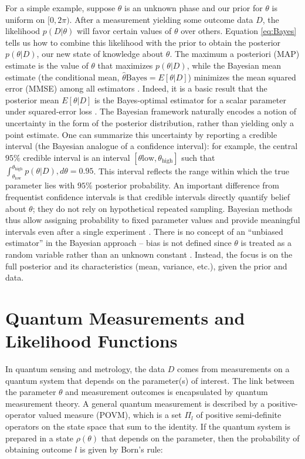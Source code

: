 For a simple example, suppose $\theta$ is an unknown phase and our
prior for $\theta$ is uniform on $[0,2\pi)$. After a measurement
  yielding some outcome data $D$, the likelihood $p(D|\theta)$ will
  favor certain values of $\theta$ over others. Equation
  \eqref{eq:Bayes} tells us how to combine this likelihood with the
  prior to obtain the posterior $p(\theta|D)$, our new state of
  knowledge about $\theta$. The maximum a posteriori (MAP) estimate is
  the value of $\theta$ that maximizes $p(\theta|D)$, while the
  Bayesian mean estimate (the conditional mean,
  $\hat{\theta}{\text{Bayes}} = E[\theta | D]$) minimizes the mean
  squared error (MMSE) among all estimators . Indeed, it is a basic
  result that the posterior mean $E[\theta|D]$ is the Bayes-optimal
  estimator for a scalar parameter under squared-error loss . The
  Bayesian framework naturally encodes a notion of uncertainty in the
  form of the posterior distribution, rather than yielding only a
  point estimate. One can summarize this uncertainty by reporting a
  credible interval (the Bayesian analogue of a confidence interval):
  for example, the central $95\%$ credible interval is an interval
  $[\theta{\text{low}}, \theta_{\text{high}}]$ such that
  $\int_{\theta_{\text{low}}}^{\theta_{\text{high}}}
  p(\theta|D),d\theta = 0.95$. This interval reflects the range within
  which the true parameter lies with $95\%$ posterior probability. An
  important difference from frequentist confidence intervals is that
  credible intervals directly quantify belief about $\theta$; they do
  not rely on hypothetical repeated sampling. Bayesian methods thus
  allow assigning probability to fixed parameter values and provide
  meaningful intervals even after a single experiment . There is no
  concept of an “unbiased estimator” in the Bayesian approach – bias
  is not defined since $\theta$ is treated as a random variable rather
  than an unknown constant . Instead, the focus is on the full
  posterior and its characteristics (mean, variance, etc.), given the
  prior and data.



\section{Quantum Measurements and Likelihood Functions}

In quantum sensing and metrology, the data $D$ comes from measurements
on a quantum system that depends on the parameter(s) of interest. The
link between the parameter $\theta$ and measurement outcomes is
encapsulated by quantum measurement theory. A general quantum
measurement is described by a positive-operator valued measure (POVM),
which is a set ${\Pi_l}$ of positive semi-definite operators on the
state space that sum to the identity. If the quantum system is
prepared in a state $\rho(\theta)$ that depends on the parameter, then
the probability of obtaining outcome $l$ is given by Born’s rule:

